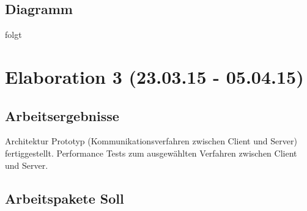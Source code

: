 \documentclass[11pt]{scrartcl}
\begin{document}
\subsection{Diagramm}
folgt
\section{Elaboration 3 (23.03.15 - 05.04.15)}
\subsection{Arbeitsergebnisse}
Architektur Prototyp (Kommunikationsverfahren zwischen Client und Server) 
fertiggestellt. 
Performance Tests zum ausgewählten Verfahren zwischen Client und Server.
\subsection{Arbeitspakete Soll}
\end{document}
